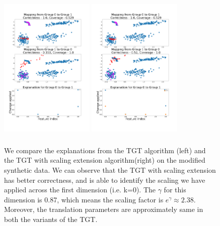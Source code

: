 \begin{figure}[H]
    \centering
    \includegraphics[width=0.4\textwidth, height=7.2cm]{images/synthetic/synthetic_modified.png}
    \includegraphics[width=0.4\textwidth, height=7.2cm]{images/synthetic/synthetic_modified_scaling.png}
    \caption{We compare the explanations from the TGT algorithm (left) and the TGT with scaling extension algorithm(right) on the modified synthetic data. We can observe that the TGT with scaling extension has better correctness, and is able to identify the scaling we have applied across the first dimension (i.e. k=0). The $\gamma$ for this dimension is 0.87, which means the scaling factor is $e^{\gamma} \approx 2.38$. Moreover, the translation parameters are approximately same in both the variants of the TGT. }
    \label{fig:synth_modified_change}
\end{figure}
\newpage
